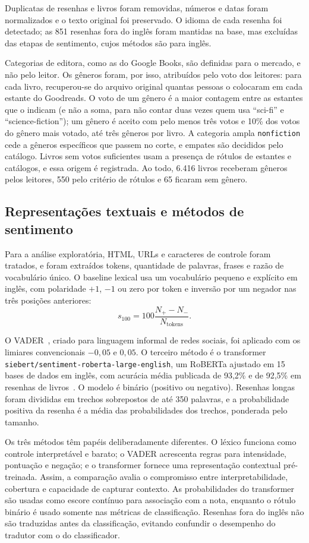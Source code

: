 \documentclass[conference]{IEEEtran}
\begin{document}
Duplicatas de resenhas e livros foram removidas, números e datas foram
normalizados e o texto original foi preservado. O idioma de cada resenha foi
detectado; as 851 resenhas fora do inglês foram mantidas na base, mas excluídas
das etapas de sentimento, cujos métodos são para inglês.

Categorias de editora, como as do Google Books, são definidas para o mercado, e
não pelo leitor. Os gêneros foram, por isso, atribuídos pelo voto dos leitores:
para cada livro, recuperou-se do arquivo original quantas pessoas o colocaram
em cada estante do Goodreads. O voto de um gênero é a maior contagem entre as
estantes que o indicam (e não a soma, para não contar duas vezes quem usa
``sci-fi'' e ``science-fiction''); um gênero é aceito com pelo menos três votos
e 10\% dos votos do gênero mais votado, até três gêneros por livro. A categoria
ampla \texttt{nonfiction} cede a gêneros específicos que passem no corte, e
empates são decididos pelo catálogo. Livros sem votos suficientes usam a
presença de rótulos de estantes e catálogos, e essa origem é registrada. Ao
todo, 6.416 livros receberam gêneros pelos leitores, 550 pelo critério de
rótulos e 65 ficaram sem gênero.

\subsection{Representações textuais e métodos de sentimento}

Para a análise exploratória, HTML, URLs e caracteres de controle foram
tratados, e foram extraídos tokens, quantidade de palavras, frases e razão de
vocabulário único. O baseline lexical usa um vocabulário pequeno e explícito
em inglês, com polaridade $+1$, $-1$ ou zero por token e inversão por um
negador nas três posições anteriores:
\[
s_{100} = 100 \frac{N_{+}-N_{-}}{N_{\text{tokens}}}.
\]

O VADER~\cite{hutto2014}, criado para linguagem informal de redes sociais, foi
aplicado com os limiares convencionais $-0{,}05$ e $0{,}05$. O terceiro método
é o transformer \texttt{siebert/sentiment-roberta-large-english}, um RoBERTa
ajustado em 15 bases de dados em inglês, com acurácia média publicada de
93,2\% e de 92,5\% em resenhas de livros~\cite{hartmann2023}. O modelo é
binário (positivo ou negativo). Resenhas longas foram divididas em trechos
sobrepostos de até 350 palavras, e a probabilidade positiva da resenha é a
média das probabilidades dos trechos, ponderada pelo tamanho.

Os três métodos têm papéis deliberadamente diferentes. O léxico funciona como
controle interpretável e barato; o VADER acrescenta regras para intensidade,
pontuação e negação; e o transformer fornece uma representação contextual
pré-treinada. Assim, a comparação avalia o compromisso entre
interpretabilidade, cobertura e capacidade de capturar contexto. As
probabilidades do transformer são usadas como escore contínuo para associação
com a nota, enquanto o rótulo binário é usado somente nas métricas de
classificação. Resenhas fora do inglês não são traduzidas antes da classificação,
evitando confundir o desempenho do tradutor com o do classificador.
\end{document}
